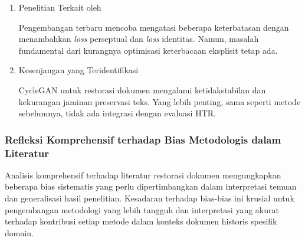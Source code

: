 \begin{enumerate}[leftmargin=*, labelindent=0pt, itemsep=1ex, topsep=0pt]
\item Penelitian Terkait oleh \parencite{ni2024}

Pengembangan terbaru mencoba mengatasi beberapa keterbatasan dengan menambahkan \textit{loss} perseptual dan \textit{loss} identitas. Namun, masalah fundamental dari kurangnya optimisasi keterbacaan eksplisit tetap ada.

\item Kesenjangan yang Teridentifikasi

CycleGAN untuk restorasi dokumen mengalami ketidakstabilan dan kekurangan jaminan preservasi teks. Yang lebih penting, sama seperti metode sebelumnya, tidak ada integrasi dengan evaluasi HTR.

\end{enumerate}

\subsubsection{Refleksi Komprehensif terhadap Bias Metodologis dalam Literatur}
\label{subsubsec:refleksi-bias}

Analisis komprehensif terhadap literatur restorasi dokumen mengungkapkan beberapa bias sistematis yang perlu dipertimbangkan dalam interpretasi temuan dan generalisasi hasil penelitian. Kesadaran terhadap bias-bias ini krusial untuk pengembangan metodologi yang lebih tangguh dan interpretasi yang akurat terhadap kontribusi setiap metode dalam konteks dokumen historis spesifik domain.

